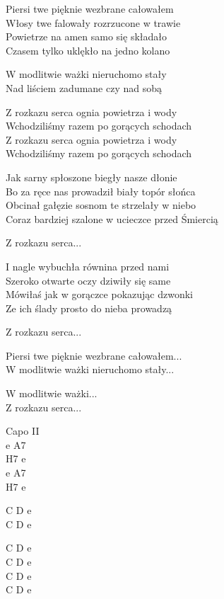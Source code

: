 \begin{text}
    \chordfill
    Piersi twe pięknie wezbrane całowałem\\
    Włosy twe falowały rozrzucone w trawie\\
    Powietrze na amen samo się składało\\
    Czasem tylko uklękło na jedno kolano

    \vin W modlitwie ważki nieruchomo stały\\
    \vin Nad liściem zadumane czy nad sobą

    \vin Z rozkazu serca ognia powietrza i wody\\
    \vin Wchodziliśmy razem po gorących schodach\\
    \vin Z rozkazu serca ognia powietrza i wody\\
    \vin Wchodziliśmy razem po gorących schodach

    Jak sarny spłoszone biegły nasze dłonie\\
    Bo za ręce nas prowadził biały topór słońca\\
    Obcinał gałęzie sosnom te strzelały w niebo\\
    Coraz bardziej szalone w ucieczce przed Śmiercią

    \vin Z rozkazu serca...

    I nagle wybuchła równina przed nami\\
    Szeroko otwarte oczy dziwiły się same\\
    Mówiłaś jak w gorączce pokazując dzwonki\\
    Ze ich ślady prosto do nieba prowadzą

    \vin Z rozkazu serca...
	
    Piersi twe pięknie wezbrane całowałem...\\
    W modlitwie ważki nieruchomo stały...
	
    \vin W modlitwie ważki...\\
    \vin Z rozkazu serca...

\end{text}
\begin{chord}
    Capo II\\
    e A7\\
    H7 e\\
    e A7\\
    H7 e

    C D e\\
    C D e

    C D e\\
    C D e\\
    C D e\\
    C D e
\end{chord}